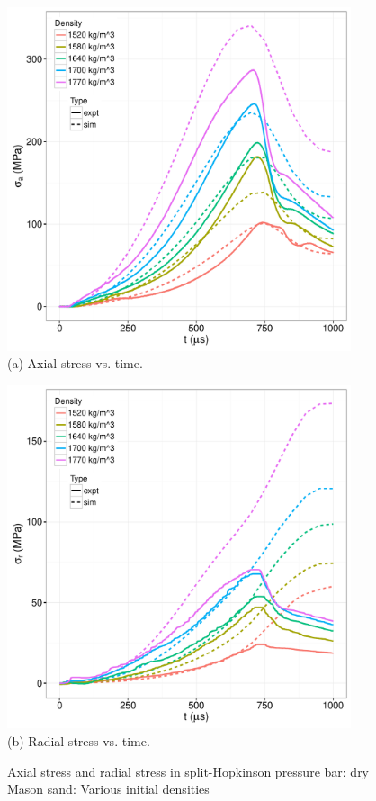 \documentclass[11pt,a4paper]{article}
\begin{document}
\begin{appendices}
\begin{figure}[htbp!]
  \begin{minipage}{0.5\textwidth}
    \centering
    \includegraphics[width=0.9\textwidth]{FIGS/MasonSandSHPB_Sat_sim_expt.pdf}\\
    (a) Axial stress vs. time.
  \end{minipage}
  \begin{minipage}{0.5\textwidth}
    \centering
    \includegraphics[width=0.9\textwidth]{FIGS/MasonSandSHPB_Srt_sim_expt.pdf}\\
    (b) Radial stress vs. time.
  \end{minipage}
  \caption{Axial stress and radial stress in split-Hopkinson pressure bar: dry Mason sand: 
           Various initial densities}
  \label{fig:shpb_dry_SaSr_density}
\end{figure}


\end{appendices}
\end{document}
